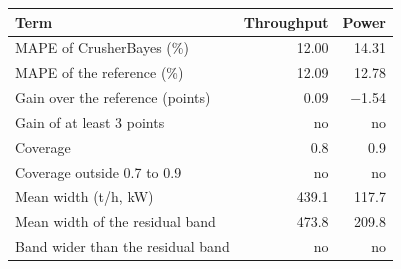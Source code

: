 \begin{tabular}{@{}lrr@{}}
\toprule
Term & Throughput & Power \\
\midrule
MAPE of CrusherBayes (\%) & 12.00 & 14.31 \\
MAPE of the reference (\%) & 12.09 & 12.78 \\
Gain over the reference (points) & 0.09 & $-$1.54 \\
Gain of at least 3 points & no & no \\
Coverage & 0.8 & 0.9 \\
Coverage outside 0.7 to 0.9 & no & no \\
Mean width (t/h, kW) & 439.1 & 117.7 \\
Mean width of the residual band & 473.8 & 209.8 \\
Band wider than the residual band & no & no \\
\bottomrule
\end{tabular}
